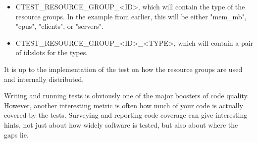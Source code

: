 \begin{itemize}
\item 
CTEST\_RESOURCE\_GROUP\_<ID>, which will contain the type of the resource groups. In the example from earlier, this will be either "mem\_mb", "cpus", "clients", or "servers".

\item 
CTEST\_RESOURCE\_GROUP\_<ID>\_<TYPE>, which will contain a pair of id:slots for the types.
\end{itemize}

It is up to the implementation of the test on how the resource groups are used and internally distributed.

Writing and running tests is obviously one of the major boosters of code quality. However, another interesting metric is often how much of your code is actually covered by the tests. Surveying and reporting code coverage can give interesting hints, not just about how widely software is tested, but also about where the gaps lie.


















